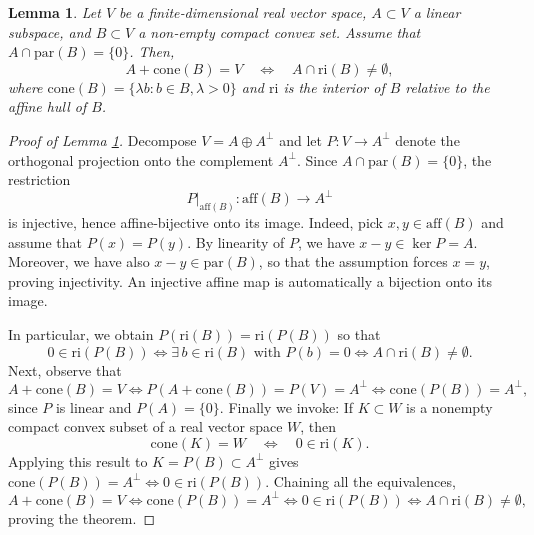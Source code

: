\documentclass[12pt]{amsart}
\numberwithin{equation}{section}
\numberwithin{equation}{section}
\theoremstyle{plain}
\newtheorem{lemma}{Lemma}
\theoremstyle{definition}
\begin{document}
\begin{lemma}\label{lem:ri}
Let $V$ be a finite‑dimensional real vector space, $A\subset V$ a linear subspace, and $B\subset V$ a non‑empty compact convex set. Assume that $A\cap \mathrm{par}(B) =\{0\}$. Then,  
\[
A+\mathrm{cone}(B) = V
\quad\iff\quad
        A \cap \mathrm{ri}(B) \neq \emptyset,
\]
where $\mathrm{cone}(B) = \{ \lambda b\colon b\in B, \lambda> 0\}$ and $\mathrm{ri}$ is the interior of $B$ relative to the affine hull of $B$. 
\end{lemma}
\begin{proof}[Proof of Lemma \ref{lem:ri}]
 Decompose $V=A\oplus A^{\perp}$ and let \(P\colon V\to A^\perp\) denote the orthogonal projection onto the complement
  \(A^\perp\). Since \(A\cap \mathrm{par}(B)=\{0\}\), the restriction
  \[
    P\bigl|_{\mathrm{aff}(B)} \colon \mathrm{aff}(B)\longrightarrow A^\perp
  \]
  is injective, hence affine‐bijective onto its image. Indeed, pick $x,y\in \mathrm{aff}(B)$ and assume that $P(x)=P(y)$. By linearity of $P$, we have $x-y\in \ker P=A$. Moreover, we have also $x-y\in \mathrm{par}(B)$, so that the assumption forces $x=y$, proving injectivity. An injective affine map is automatically a bijection onto its image.
  
  
  In particular, we obtain  $ P(\mathrm{ri}(B)) =\mathrm{ri}(P(B))$ so that 
  \[    0\in\mathrm{ri}(P(B))
    \iff
    \exists\,b\in\mathrm{ri}(B)\text{ with }P(b)=0
    \iff
    A\cap\mathrm{ri}(B)\neq\emptyset.
  \]
  Next, observe that
  \[
    A + \mathrm{cone}(B) = V
    \iff
    P(A+\mathrm{cone}(B)) = P(V)=A^\perp
    \iff
    \mathrm{cone}(P(B))=A^\perp,
  \]
  since \(P\) is linear and \(P(A)=\{0\}\).
  Finally we invoke:
    If \(K\subset W\) is a nonempty compact convex subset of a real vector space \(W\),
    then
    \[
      \mathrm{cone}(K)=W
      \quad\iff\quad
      0\in\mathrm{ri}(K).
    \]
  Applying this result to \(K=P(B)\subset A^\perp\) gives
  \(\mathrm{cone}(P(B))=A^\perp\iff 0\in\mathrm{ri}(P(B))\).  Chaining all
  the equivalences,
  \[
    A+\mathrm{cone}(B)=V
    \iff
    \mathrm{cone}(P(B))=A^\perp
    \iff
    0\in\mathrm{ri}(P(B))
    \iff
    A\cap\mathrm{ri}(B)\neq\emptyset,
  \]
  proving the theorem.
\end{proof}
\end{document}
